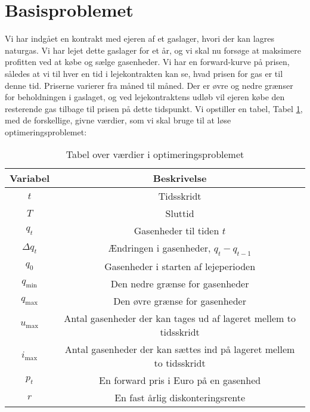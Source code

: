 \section{Basisproblemet}
Vi har indgået en kontrakt med ejeren af et gaslager, hvori der kan lagres naturgas. Vi har lejet dette gaslager for et år, og vi skal nu forsøge at maksimere profitten ved at købe og sælge gasenheder. Vi har en forward-kurve på prisen, således at vi til hver en tid i lejekontrakten kan se, hvad prisen for gas er til denne tid. Priserne varierer fra måned til måned. Der er øvre og nedre grænser for beholdningen i gaslaget, og ved lejekontraktens udløb vil ejeren købe den resterende gas tilbage til prisen på dette tidspunkt. Vi opstiller en tabel, Tabel \ref{table:1}, med de forskellige, givne værdier, som vi skal bruge til at løse optimeringsproblemet:

\begin{table}[h!]
\centering
\begin{tabular}{||c | c||} 
 \hline
 Variabel & Beskrivelse \\ [0.5ex] 
 \hline\hline
 $t$ & Tidsskridt  \\ 
 $T$ & Sluttid  \\
 $q_{t}$ & Gasenheder til tiden $t$  \\
 $\Delta q_{t}$ & Ændringen i gasenheder,    $q_{t}-q_{t-1}$ \\
 $q_{0}$ & Gasenheder i starten af lejeperioden  \\
 $q_{\min}$ & Den nedre grænse for gasenheder \\ 
 $q_{\max}$ & Den øvre grænse for gasenheder \\
 $u_{\max}$ & Antal gasenheder der kan tages ud af lageret mellem to tidsskridt \\ 
 $i_{\max}$ & Antal gasenheder der kan sættes ind på lageret mellem to tidsskridt \\ 
 $p_{t}$ & En forward pris i Euro på en gasenhed  \\
 $r$ & En fast årlig diskonteringsrente  \\
 [1ex] 
 \hline
\end{tabular}
\caption{Tabel over værdier i optimeringsproblemet}
\label{table:1}
\end{table}

